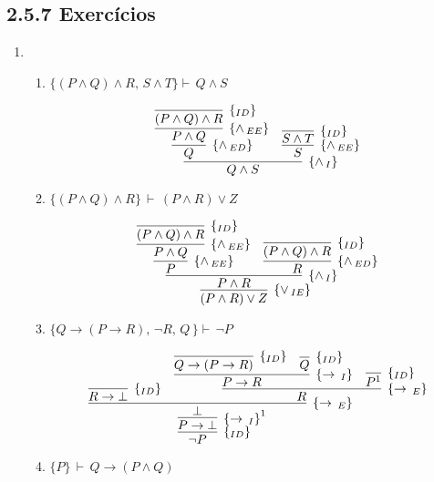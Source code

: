 \subsection{2.5.7 Exerc\'icios}
\begin{enumerate}
	\item
	\begin{enumerate}
	\item $\{(P\land Q)\land R,\, S\land T\}\vdash\,Q\land S$
	
	\[
      \infer[\andI]
               {Q\land S}
               {
                   \infer[\andED]
                            {Q}
                            {
                            \infer[\andEE]
                            		{P\land Q}
                            		{
                            			\infer[\Id]
                            				{(P\land Q)\land R}
                            				{}
                            		}
                            }
                    &  
                   \infer[\andEE]
                            {S}
                            {
	                            \infer[\Id]
	                                   {S\land T}{}
                            }
               }
 	 \]
 	 
 	 
 	 \item $\{(P\land Q)\land R\}\,\vdash\,(P\land R)\lor Z$
 	 
 	 \[
 	 	\infer[\orIE]
 	 		{(P\land R)\lor Z}
 	 		{
 	 			\infer[\andI]
 	 				{P \land R}
 	 				{
 	 					\infer[\andEE]
 	 						{P}
 	 						{
 	 							\infer[\andEE]
 	 								{P\land Q}
 	 								{\infer[\Id]{(P\land Q)\land R}{}}
 	 						}
 	 					&
 	 					\infer[\andED]
 	 						{R}
 	 						{\infer[\Id]{(P\land Q)\land R}{}}
 	 				}
 	 		}
 	 \]
 	 
 	 \item  $\{Q\rightarrow (P\rightarrow R),\, \neg R,\, Q\,\} \vdash\,\neg P$
		
	\[
		\infer[\Id]
			{\neg P}
			{
				\infer[\impI^1]
					{P \to \bot}
					{
						\infer[\impE]
							{\bot}
							{
								\infer[\Id]
									{R \to \bot}{}
							&
								\infer[\impE]
									{R}
									{
										\infer[\impI]
											{P \to R}
											{
												\infer[\Id]
													{Q \to (P \to R)}
													{}
												&
												\infer[\Id]
													{Q}
													{}
											}
										&
										\infer[\Id]
											{P^1}
											{}
									}
							}
					}
			}	
	\]
	
	\item $\{P\}\,\vdash\, Q\rightarrow(P\land Q)$
	

\end{enumerate}
\end{enumerate}
